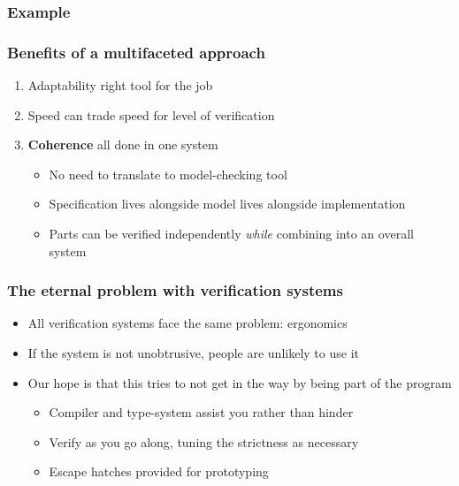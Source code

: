 \documentclass[compress]{beamer}
\begin{document}
\begin{frame}
  \frametitle{Example}

\end{frame}

\begin{frame}
  \frametitle{Benefits of a multifaceted approach}

  \begin{enumerate}
    \item Adaptability {\textemdash} right tool for the job
    \item Speed {\textemdash} can trade speed for level of verification
    \item \textbf{Coherence} {\textemdash} all done in one system
      \begin{itemize}
        \item No need to translate to model-checking tool
        \item Specification lives alongside model lives alongside
              implementation
        \item Parts can be verified independently \emph{while} combining into an
              overall system
      \end{itemize}
  \end{enumerate}

\end{frame}

\begin{frame}
  \frametitle{The eternal problem with verification systems}

  \begin{itemize}
    \item All verification systems face the same problem: ergonomics
    \item If the system is not unobtrusive, people are unlikely to use it
    \item Our hope is that this tries to not get in the way by being part of the
          program
      \begin{itemize}
        \item Compiler and type-system assist you rather than hinder
        \item Verify as you go along, tuning the strictness as necessary
        \item Escape hatches provided for prototyping
      \end{itemize}
  \end{itemize}

\end{frame}
\end{document}
